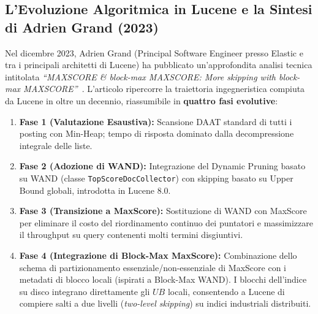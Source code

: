 \FloatBarrier
\subsection{L'Evoluzione Algoritmica in Lucene e la Sintesi di Adrien Grand (2023)}
Nel dicembre 2023, Adrien Grand (Principal Software Engineer presso Elastic e tra i principali architetti di Lucene) ha pubblicato un'approfondita analisi tecnica intitolata \textit{``MAXSCORE \& block-max MAXSCORE: More skipping with block-max MAXSCORE''}~\cite{grand2023}. L'articolo ripercorre la traiettoria ingegneristica compiuta da Lucene in oltre un decennio, riassumibile in \textbf{quattro fasi evolutive}:
\begin{enumerate}
    \item \textbf{Fase 1 (Valutazione Esaustiva):} Scansione DAAT standard di tutti i posting con Min-Heap; tempo di risposta dominato dalla decompressione integrale delle liste.
    \item \textbf{Fase 2 (Adozione di WAND):} Integrazione del Dynamic Pruning basato su WAND (classe \texttt{TopScoreDocCollector}) con skipping basato su Upper Bound globali, introdotta in Lucene 8.0.
    \item \textbf{Fase 3 (Transizione a MaxScore):} Sostituzione di WAND con MaxScore per eliminare il costo del riordinamento continuo dei puntatori e massimizzare il throughput su query contenenti molti termini disgiuntivi.
    \item \textbf{Fase 4 (Integrazione di Block-Max MaxScore):} Combinazione dello schema di partizionamento essenziale/non-essenziale di MaxScore con i metadati di blocco locali (ispirati a Block-Max WAND). I blocchi dell'indice su disco integrano direttamente gli $UB$ locali, consentendo a Lucene di compiere salti a due livelli (\textit{two-level skipping}) su indici industriali distribuiti.
\end{enumerate}

\FloatBarrier
